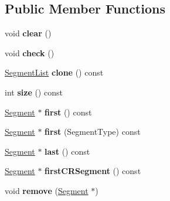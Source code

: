 \subsection*{Public Member Functions}
\begin{DoxyCompactItemize}
\item 
\mbox{\label{class_ms_1_1_segment_list_acd9c41d2ea9abcdad80daeb4b96f40e2}} 
void {\bfseries clear} ()
\item 
\mbox{\label{class_ms_1_1_segment_list_aaa74a232a470a6d542788401501898aa}} 
void {\bfseries check} ()
\item 
\mbox{\label{class_ms_1_1_segment_list_ae0606ed51fa60e8b42b22ab8111fe958}} 
\hyperlink{class_ms_1_1_segment_list}{Segment\+List} {\bfseries clone} () const
\item 
\mbox{\label{class_ms_1_1_segment_list_a891968fad18560ed40186c7e66dd5ac4}} 
int {\bfseries size} () const
\item 
\mbox{\label{class_ms_1_1_segment_list_a1c5127040399ae54ec30a8e1d19a28d9}} 
\hyperlink{class_ms_1_1_segment}{Segment} $\ast$ {\bfseries first} () const
\item 
\mbox{\label{class_ms_1_1_segment_list_ab0ef3e89f4caa968c4b257614609e3b5}} 
\hyperlink{class_ms_1_1_segment}{Segment} $\ast$ {\bfseries first} (Segment\+Type) const
\item 
\mbox{\label{class_ms_1_1_segment_list_ae3c78e334cda26e0207c6b4b70bb78db}} 
\hyperlink{class_ms_1_1_segment}{Segment} $\ast$ {\bfseries last} () const
\item 
\mbox{\label{class_ms_1_1_segment_list_a8597ccbc5e7745a6d24b34aa0581c8b2}} 
\hyperlink{class_ms_1_1_segment}{Segment} $\ast$ {\bfseries first\+C\+R\+Segment} () const
\item 
\mbox{\label{class_ms_1_1_segment_list_aaa8aee7ee1e871e4a84ab15547c5e38a}} 
void {\bfseries remove} (\hyperlink{class_ms_1_1_segment}{Segment} $\ast$)
\item 

\end{DoxyCompactItemize}
